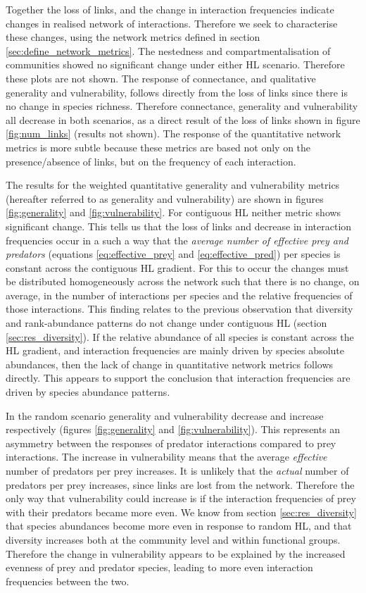Together the loss of links, and the change in interaction frequencies indicate changes in realised network of interactions. Therefore we seek to characterise these changes, using the network metrics defined in section \ref{sec:define_network_metrics}. The nestedness and compartmentalisation of communities showed no significant change under either HL scenario. Therefore these plots are not shown. 
The response of connectance, and qualitative generality and vulnerability, follows directly from the loss of links since there is no change in species richness. Therefore connectance, generality and vulnerability all decrease in both scenarios, as a direct result of the loss of links shown in figure \ref{fig:num_links} (results not shown). The response of the quantitative network metrics is more subtle because these metrics are based not only on the presence/absence of links, but on the frequency of each interaction. 

The results for the weighted quantitative generality and vulnerability metrics (hereafter referred to as generality and vulnerability) are shown in figures \ref{fig:generality} and \ref{fig:vulnerability}. For contiguous HL neither metric shows significant change. This tells us that the loss of links and decrease in interaction frequencies occur in a such a way that the \emph{average number of effective prey and predators} (equations \eqref{eq:effective_prey} and \eqref{eq:effective_pred}) per species is constant across the contiguous HL gradient. For this to occur the changes must be distributed homogeneously across the network such that there is no change, on average, in the number of interactions per species and the relative frequencies of those interactions. This finding relates to the previous observation that diversity and rank-abundance patterns do not change under contiguous HL (section \ref{sec:res_diversity}). If the relative abundance of all species is constant across the HL gradient, and interaction frequencies are mainly driven by species absolute abundances, then the lack of change in quantitative network metrics follows directly. This appears to support the conclusion that interaction frequencies are driven by species abundance patterns.

In the random scenario generality and vulnerability decrease and increase respectively (figures \ref{fig:generality} and \ref{fig:vulnerability}). This represents an asymmetry between the responses of predator interactions compared to prey interactions. The increase in vulnerability means that the average \emph{effective} number of predators per prey increases. It is unlikely that the \emph{actual} number of predators per prey increases, since links are lost from the network. Therefore the only way that vulnerability could increase is if the interaction frequencies of prey with their predators became more even. We know from section \ref{sec:res_diversity} that species abundances become more even in response to random HL, and that diversity increases both at the community level and within functional groups. Therefore the change in vulnerability appears to be explained by the increased evenness of prey and predator species, leading to more even interaction frequencies between the two.  

